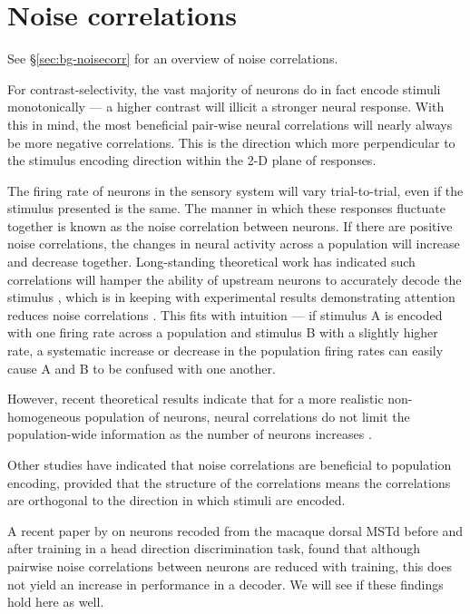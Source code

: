 \FloatBarrier
\section{Noise correlations}

See \S\ref{sec:bg-noisecorr} for an overview of noise correlations.

For contrast-selectivity, the vast majority of neurons do in fact encode stimuli monotonically --- a higher contrast will illicit a stronger neural response. With this in mind, the most beneficial pair-wise neural correlations will nearly always be more negative correlations. This is the direction which more perpendicular to the stimulus encoding direction within the 2-D plane of responses.



The firing rate of neurons in the sensory system will vary trial-to-trial, even if the stimulus presented is the same.
The manner in which these responses fluctuate together is known as the noise correlation between neurons.
If there are positive noise correlations, the changes in neural activity across a population will increase and decrease together.
Long-standing theoretical work has indicated such correlations will hamper the ability of upstream neurons to accurately decode the stimulus%
, which is in keeping with experimental results demonstrating attention reduces noise correlations \citep{Cohen2009}.
This fits with intuition --- if stimulus A is encoded with one firing rate across a population and stimulus B with a slightly higher rate, a systematic increase or decrease in the population firing rates can easily cause A and B to be confused with one another.

However, recent theoretical results indicate that for a more realistic non-homogeneous population of neurons, neural correlations do not limit the population-wide information as the number of neurons increases \citep{Oram1998,Averbeck2006,Ecker2011}.

Other studies have indicated that noise correlations are beneficial to population encoding, provided that the structure of the correlations means the correlations are orthogonal to the direction in which stimuli are encoded.

A recent paper by \citet{Gu2011} on neurons recoded from the macaque dorsal \ac{MSTd} before and after training in a head direction discrimination task, found that although pairwise noise correlations between neurons are reduced with training, this does not yield an increase in performance in a decoder.
We will see if these findings hold here as well.

